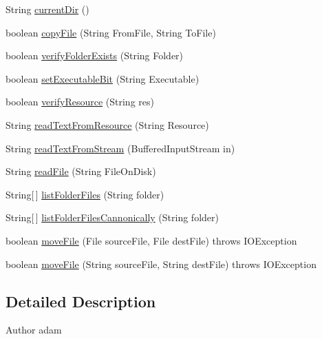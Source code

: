 \begin{DoxyCompactItemize}
String \hyperlink{classCASUAL_1_1FileOperations_a6218a9a8ce1c18711d59b844417adc8a}{current\-Dir} ()
\item 
boolean \hyperlink{classCASUAL_1_1FileOperations_a13967d313b6bd64f4449872f39cd9850}{copy\-File} (String From\-File, String To\-File)
\item 
boolean \hyperlink{classCASUAL_1_1FileOperations_a72f6ff01f9e8173ecaf57cdf1846c53e}{verify\-Folder\-Exists} (String Folder)
\item 
boolean \hyperlink{classCASUAL_1_1FileOperations_ad065441f27945626464c5ea2a5b1e453}{set\-Executable\-Bit} (String Executable)
\item 
boolean \hyperlink{classCASUAL_1_1FileOperations_a24a24d669cba59590ae6dbb73b9b7bfa}{verify\-Resource} (String res)
\item 
String \hyperlink{classCASUAL_1_1FileOperations_af56078757baad2c1f1ce56bbe88ed583}{read\-Text\-From\-Resource} (String Resource)
\item 
String \hyperlink{classCASUAL_1_1FileOperations_a0f818b3dd5c29e59cd68073279769a99}{read\-Text\-From\-Stream} (Buffered\-Input\-Stream in)
\item 
String \hyperlink{classCASUAL_1_1FileOperations_abb169d1cec0dd7a93538d2664aa30100}{read\-File} (String File\-On\-Disk)
\item 
String\mbox{[}$\,$\mbox{]} \hyperlink{classCASUAL_1_1FileOperations_a61c260f82398c5fb5dae686cb03e8466}{list\-Folder\-Files} (String folder)
\item 
String\mbox{[}$\,$\mbox{]} \hyperlink{classCASUAL_1_1FileOperations_a7e7c47afd356adc222f64c61d735e85b}{list\-Folder\-Files\-Cannonically} (String folder)
\item 
boolean \hyperlink{classCASUAL_1_1FileOperations_aba0a4098903773ba1b9e5b1b926e2796}{move\-File} (File source\-File, File dest\-File)  throws I\-O\-Exception 
\item 
boolean \hyperlink{classCASUAL_1_1FileOperations_a9c21e368697269b0c57b3534cefb6295}{move\-File} (String source\-File, String dest\-File)  throws I\-O\-Exception 
\end{DoxyCompactItemize}


\subsection{Detailed Description}
\begin{DoxyAuthor}{Author}
adam 
\end{DoxyAuthor}


